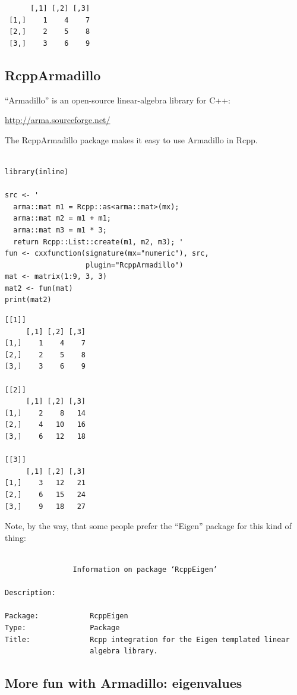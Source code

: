 \documentclass[11pt]{article}
\begin{document}
\begin{verbatim}
      [,1] [,2] [,3]
 [1,]    1    4    7
 [2,]    2    5    8
 [3,]    3    6    9
\end{verbatim}
\subsection{RcppArmadillo}
\label{sec-6-2}


``Armadillo'' is an open-source linear-algebra library for C++:

    \href{http://arma.sourceforge.net/}{http://arma.sourceforge.net/}

The RcppArmadillo package makes it easy to use Armadillo in Rcpp.


\begin{verbatim}

library(inline)

src <- '
  arma::mat m1 = Rcpp::as<arma::mat>(mx);
  arma::mat m2 = m1 + m1;
  arma::mat m3 = m1 * 3;
  return Rcpp::List::create(m1, m2, m3); '
fun <- cxxfunction(signature(mx="numeric"), src,
                   plugin="RcppArmadillo")
mat <- matrix(1:9, 3, 3)
mat2 <- fun(mat)
print(mat2)
\end{verbatim}


\begin{verbatim}
[[1]]
     [,1] [,2] [,3]
[1,]    1    4    7
[2,]    2    5    8
[3,]    3    6    9

[[2]]
     [,1] [,2] [,3]
[1,]    2    8   14
[2,]    4   10   16
[3,]    6   12   18

[[3]]
     [,1] [,2] [,3]
[1,]    3   12   21
[2,]    6   15   24
[3,]    9   18   27
\end{verbatim}


Note, by the way, that some people prefer the ``Eigen'' package for this
kind of thing:


\begin{verbatim}

                Information on package ‘RcppEigen’

Description:

Package:            RcppEigen
Type:               Package
Title:              Rcpp integration for the Eigen templated linear
                    algebra library.
\end{verbatim}
\subsection{More fun with Armadillo: eigenvalues}
\label{sec-6-3}
\end{document}
